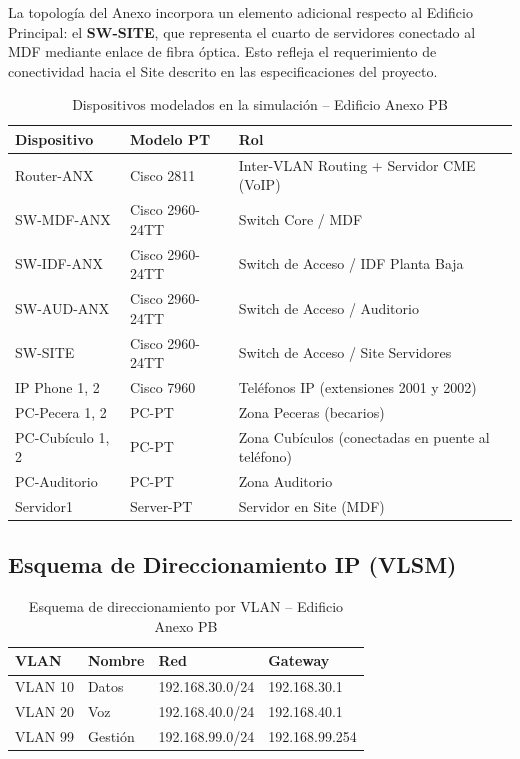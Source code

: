 \documentclass[11pt, letterpaper]{article}
\begin{document}
La topología del Anexo incorpora un elemento adicional respecto al Edificio Principal: el \textbf{SW-SITE}, que representa el cuarto de servidores conectado al MDF mediante enlace de fibra óptica. Esto refleja el requerimiento de conectividad hacia el Site descrito en las especificaciones del proyecto.

\begin{table}[h!]
\centering
{}
\renewcommand{\arraystretch}{1.3}
\begin{tabularx}{\textwidth}{@{} l l X @{}}
\toprule
\rowcolor{OroUNAM!20}
\textbf{Dispositivo} & \textbf{Modelo PT} & \textbf{Rol} \\ \midrule
Router-ANX & Cisco 2811 & Inter-VLAN Routing + Servidor CME (VoIP) \\
SW-MDF-ANX & Cisco 2960-24TT & Switch Core / MDF \\
SW-IDF-ANX & Cisco 2960-24TT & Switch de Acceso / IDF Planta Baja \\
SW-AUD-ANX & Cisco 2960-24TT & Switch de Acceso / Auditorio \\
SW-SITE & Cisco 2960-24TT & Switch de Acceso / Site Servidores \\
IP Phone 1, 2 & Cisco 7960 & Teléfonos IP (extensiones 2001 y 2002) \\
PC-Pecera 1, 2 & PC-PT & Zona Peceras (becarios) \\
PC-Cubículo 1, 2 & PC-PT & Zona Cubículos (conectadas en puente al teléfono) \\
PC-Auditorio & PC-PT & Zona Auditorio \\
Servidor1 & Server-PT & Servidor en Site (MDF) \\ \bottomrule
\end{tabularx}
\caption{Dispositivos modelados en la simulación -- Edificio Anexo PB}
\end{table}

\subsection*{Esquema de Direccionamiento IP (VLSM)}

\begin{table}[h!]
\centering
{}
\renewcommand{\arraystretch}{1.3}
\begin{tabularx}{\textwidth}{@{} l l l l @{}}
\toprule
\rowcolor{OroUNAM!20}
\textbf{VLAN} & \textbf{Nombre} & \textbf{Red} & \textbf{Gateway} \\ \midrule
VLAN 10 & Datos & 192.168.30.0/24 & 192.168.30.1 \\
VLAN 20 & Voz & 192.168.40.0/24 & 192.168.40.1 \\
VLAN 99 & Gestión & 192.168.99.0/24 & 192.168.99.254 \\ \bottomrule
\end{tabularx}
\caption{Esquema de direccionamiento por VLAN -- Edificio Anexo PB}
\end{table}
\end{document}
